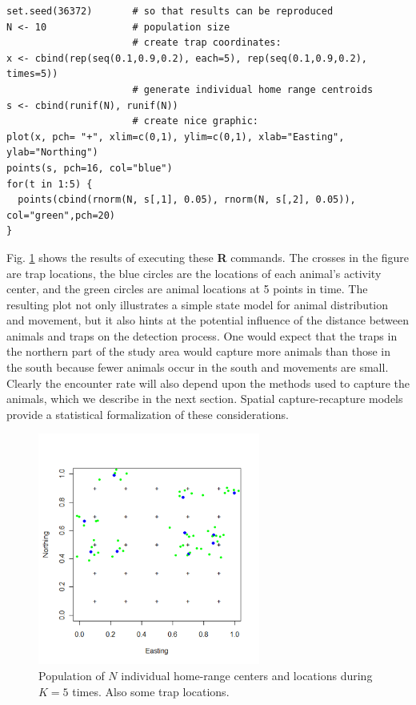 {\small
\begin{verbatim}
set.seed(36372)       # so that results can be reproduced
N <- 10               # population size
                      # create trap coordinates:
x <- cbind(rep(seq(0.1,0.9,0.2), each=5), rep(seq(0.1,0.9,0.2), times=5)) 
                      # generate individual home range centroids
s <- cbind(runif(N), runif(N))    
                      # create nice graphic:
plot(x, pch= "+", xlim=c(0,1), ylim=c(0,1), xlab="Easting", ylab="Northing")
points(s, pch=16, col="blue") 
for(t in 1:5) {
  points(cbind(rnorm(N, s[,1], 0.05), rnorm(N, s[,2], 0.05)), col="green",pch=20)
}
\end{verbatim}
}

Fig. \ref{intro.fig.fig1} shows the results of executing these {\bf R} commands. The crosses
in the figure are trap locations, the blue circles are the locations
of each animal's activity center, and the green circles are animal
locations at 5 points in time.  The resulting plot not only
illustrates a simple state model for animal distribution and movement,
but it also hints at the potential influence of the distance between
animals and traps on the detection process. One would expect that the
traps in the northern part of the study area would capture more
animals than those in the south because fewer animals occur in the
south and movements are small. Clearly the encounter rate will also
depend upon the methods used to capture the animals, which we describe
in the next section.  Spatial capture-recapture models provide a
statistical formalization of these considerations. 


\begin{figure}
\begin{center}
\includegraphics[height=3in]{Ch1/figs/northingeasting}
\end{center}
\caption{Population of $N$ individual home-range centers and locations
  during $K=5$ times. Also some trap locations.}
\label{intro.fig.fig1}
\end{figure}

